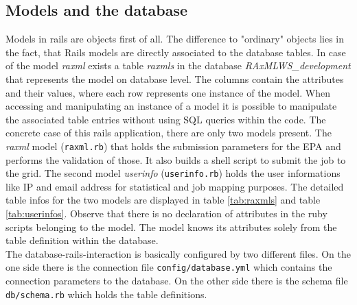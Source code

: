 \documentclass{scrartcl}
\begin{document}
		\subsection{Models and the database}
			Models in rails are objects first of all. The difference  to "ordinary" objects lies in the fact, that Rails models are directly associated to the database tables. In case of the model \textit{raxml} exists a table \textit{raxmls} in the database \textit{RAxMLWS\_development} that represents the model on database level. The columns contain the attributes and their values, where each row represents one  instance of the model. When accessing and manipulating an instance of a model it is possible to manipulate the associated table entries without using SQL queries within the code. The concrete case of this rails application, there are only  two models present. The \textit{raxml} model (\texttt{raxml.rb}) that holds the submission parameters  for  the EPA and performs the validation of those. It also builds a shell script to submit the job to the grid. The second model \textit{userinfo} (\texttt{userinfo.rb}) holds  the user informations like IP and email address for statistical and job mapping purposes. The detailed table infos for the two models are displayed in table \ref{tab:raxmls} and table \ref{tab:userinfos}. Observe that there is no declaration of attributes in the ruby scripts belonging to the model. The model knows its attributes solely from the table definition within the database. \\
			The database-rails-interaction is basically configured by two different files. On the one side there is the connection file \texttt{config/database.yml} which contains the connection parameters to the database. On the other side there is the schema file \texttt{db/schema.rb}  which holds the table definitions.
			
\end{document}
